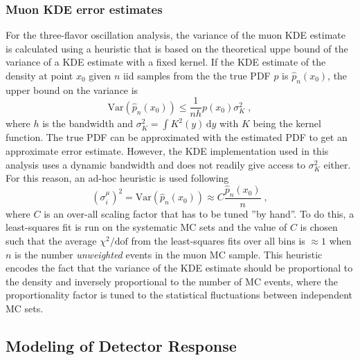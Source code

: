 \subsubsection{Muon KDE error estimates}
For the three-flavor oscillation analysis, the variance of the muon KDE estimate is calculated using a heuristic that is based on the theoretical uppe bound of the variance of a KDE estimate with a fixed kernel. If the KDE estimate of the density at point $x_0$ given $n$ iid samples from the the true PDF $p$ is $\hat{p}_n(x_0)$, the upper bound on the variance is
\begin{equation}
    \mathrm{Var}(\hat{p}_n(x_0)) \leq \frac{1}{nh}p(x_0)\sigma_K^2\;,\label{eq:kde-var-upper-bound}
\end{equation}
where $h$ is the bandwidth and $\sigma_K^2=\int K^2(y)\,\mathrm{d}y$ with $K$ being the kernel function. The true PDF can be approximated with the estimated PDF to get an approximate error estimate. However, the KDE implementation used in this analysis uses a dynamic bandwidth and does not readily give access to $\sigma_K^2$ either. For this reason, an ad-hoc heuristic is used following
\begin{equation}
    (\sigma^{\mu}_i)^2 = \mathrm{Var}(\hat{p}_n(x_0))\approx C\frac{\hat{p}_n(x_0)}{n}\;,\label{eq:kde-var-ad-hoc}
\end{equation}
where $C$ is an over-all scaling factor that has to be tuned ''by hand''. To do this, a least-squares fit is run on the systematic MC sets and the value of $C$ is chosen such that the average $\chi^2/\mathrm{dof}$ from the least-squares fits over all bins is $\approx 1$ when $n$ is the number \emph{unweighted} events in the muon MC sample. This heuristic encodes the fact that the variance of the KDE estimate should be proportional to the density and inversely proportional to the number of MC events, where the proportionality factor is tuned to the statistical fluctuations between independent MC sets.

\subsection{Modeling of Detector Response}
\label{sec:hypersurfaces}

